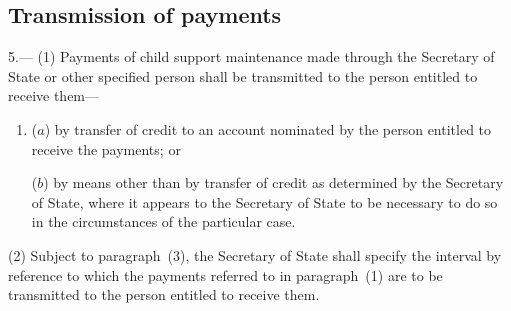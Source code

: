 \documentclass[12pt,a4paper]{article}
\begin{document}

\subsection[5. Transmission of payments]{Transmission of payments}

5.—%
%
%
%
(1) Payments of child support maintenance made through the Secretary of State or other specified person shall be transmitted to the person entitled to receive them---
\begin{enumerate}\item[]
($a$) by transfer of credit to an account nominated by the person entitled to receive the payments; or

($b$) by means other than by transfer of credit as determined by the Secretary of State, where it appears to the Secretary of State to be necessary to do so in the circumstances of the particular case.
\end{enumerate}

(2) 
Subject to paragraph~(3), the Secretary of State  %
shall specify the interval by reference to which the payments referred to in paragraph~(1) are to be transmitted to the person entitled to receive them.

%
%
\end{document}
